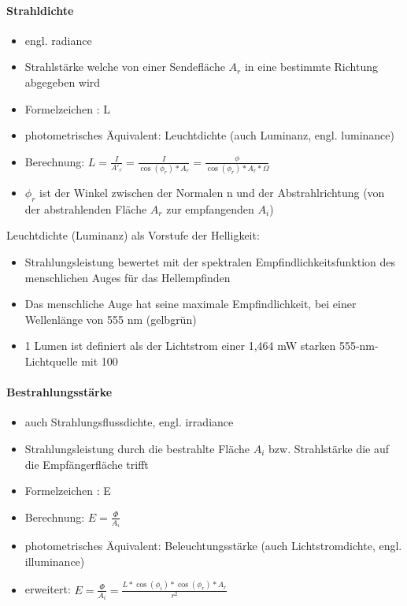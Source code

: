 \documentclass[10pt,landscape]{article}
\begin{document}
\begin{multicols}{3}
\paragraph{Strahldichte}
\begin{itemize}
  \item engl. radiance
  \item Strahlstärke welche von einer Sendefläche $A_r$ in eine bestimmte Richtung abgegeben wird
  \item Formelzeichen : L
  \item photometrisches Äquivalent: Leuchtdichte (auch Luminanz, engl. luminance)
  \item Berechnung: $L = \frac{I}{A'_r}=\frac{I}{\cos(\phi_r)*A_r} = \frac{\phi}{\cos(\phi_r)*A_r*\Omega}$
  \item $\phi_r$ ist der Winkel zwischen der Normalen n und der Abstrahlrichtung (von der abstrahlenden Fläche $A_r$ zur empfangenden $A_i$)
\end{itemize}

Leuchtdichte (Luminanz) als Vorstufe der Helligkeit:
\begin{itemize}
  \item Strahlungsleistung bewertet mit der spektralen Empfindlichkeitsfunktion des menschlichen Auges für das Hellempfinden
  \item Das menschliche Auge hat seine maximale Empfindlichkeit, bei einer Wellenlänge von 555 nm (gelbgrün)
  \item 1 Lumen ist definiert als der Lichtstrom einer 1,464 mW starken 555-nm-Lichtquelle mit 100%
\end{itemize}


\paragraph{Bestrahlungsstärke}
\begin{itemize}
  \item auch Strahlungsflussdichte, engl. irradiance
  \item Strahlungsleistung durch die bestrahlte Fläche $A_i$ bzw. Strahlstärke die auf die Empfängerfläche trifft
  \item Formelzeichen : E
  \item Berechnung: $E =\frac{\Phi}{A_i}$
  \item photometrisches Äquivalent: Beleuchtungsstärke (auch Lichtstromdichte, engl. illuminance)
  \item erweitert: $E=\frac{\Phi}{A_i}=\frac{L*\cos(\phi_i)*\cos(\phi_r)*A_r}{r^2}$
\end{itemize}


\end{multicols}
\end{document}
